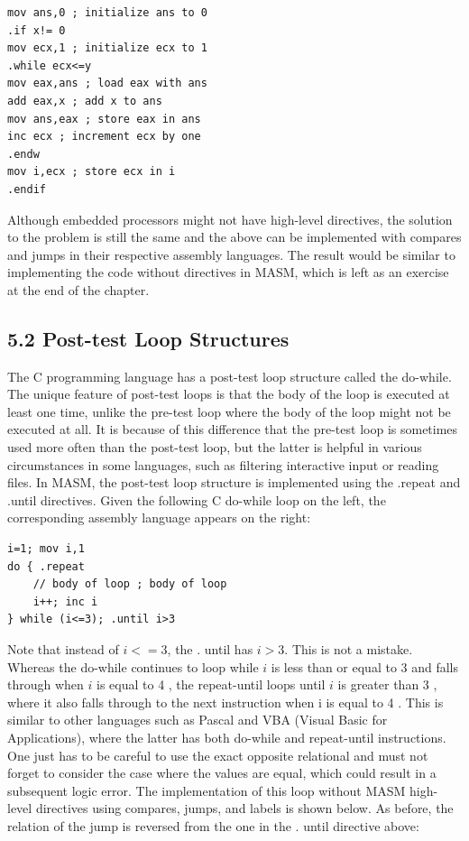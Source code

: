 \documentclass[10pt]{book}
\begin{document}
\begin{verbatim}
mov ans,0 ; initialize ans to 0
.if x!= 0
mov ecx,1 ; initialize ecx to 1
.while ecx<=y
mov eax,ans ; load eax with ans
add eax,x ; add x to ans
mov ans,eax ; store eax in ans
inc ecx ; increment ecx by one
.endw
mov i,ecx ; store ecx in i
.endif
\end{verbatim}

Although embedded processors might not have high-level directives, the solution to the problem is still the same and the above can be implemented with compares and jumps in their respective assembly languages. The result would be similar to implementing the code without directives in MASM, which is left as an exercise at the end of the chapter.

\subsection*{5.2 Post-test Loop Structures}
The C programming language has a post-test loop structure called the do-while. The unique feature of post-test loops is that the body of the loop is executed at least one time, unlike the pre-test loop where the body of the loop might not be executed at all. It is because of this difference that the pre-test loop is sometimes used more often than the post-test loop, but the latter is helpful in various circumstances in some languages, such as filtering interactive input or reading files. In MASM, the post-test loop structure is implemented using the .repeat and .until directives. Given the following C do-while loop on the left, the corresponding assembly language appears on the right:

\begin{verbatim}
i=1; mov i,1
do { .repeat
    // body of loop ; body of loop
    i++; inc i
} while (i<=3); .until i>3
\end{verbatim}

Note that instead of $i<=3$, the . until has $i>3$. This is not a mistake. Whereas the do-while continues to loop while $i$ is less than or equal to 3 and falls through when $i$ is equal to 4 , the repeat-until loops until $i$ is greater than 3 , where it also falls through to the next instruction when i is equal to 4 . This is similar to other languages such as Pascal and VBA (Visual Basic for Applications), where the latter has both do-while and repeat-until instructions. One just has to be careful to use the exact opposite relational and must not forget to consider the case where the values are equal, which could result in a subsequent logic error. The implementation of this loop without MASM high-level directives using compares, jumps, and labels is shown below. As before, the relation of the jump is reversed from the one in the . until directive above:
\end{document}
